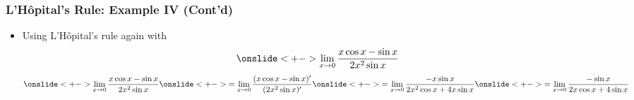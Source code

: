 \documentclass[usenames,dvipsnames,8pt,aspectratio=169]{beamer}
\begin{document}
\begin{frame}
  \frametitle{L'H\^opital's Rule: Example IV (Cont'd)}
  \begin{itemize}
    \item Using L'H\^opital's rule again with
      \begin{align*}
        \onslide<+->{\lim_{x\to0}\frac{x\cos x - \sin x}{2 x^2\sin x}}
      \end{align*}
      \begin{align*}
        \onslide<+->{\lim_{x\to0}\frac{x\cos x - \sin x}{2 x^2\sin x}}\onslide<+->{ = \lim_{x\to0}\frac{(x\cos x - \sin x)'}{(2 x^2\sin x)'}}\onslide<+->{= \lim_{x\to0}\frac{- x\sin x}{2x^2\cos x + 4x\sin x}}\onslide<+->{ = \lim_{x\to0}\frac{-\sin x}{2 x\cos x + 4\sin x}}
      \end{align*}
  \end{itemize}
\end{frame}
\end{document}
